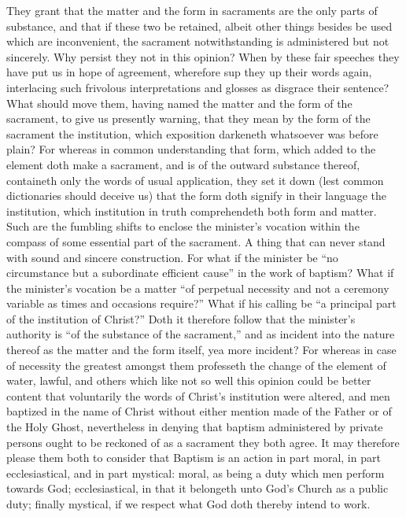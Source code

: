 They grant that the matter and the form in sacraments are the only parts of substance, and that if these two be retained, albeit other things besides be used which are inconvenient, the sacrament notwithstanding is administered but not sincerely. Why persist they not in this opinion? When by these fair speeches they have put us in hope of agreement, wherefore sup they up their words again, interlacing such frivolous interpretations and glosses as disgrace their sentence? What should move them, having named the matter and the form of the sacrament, to give us presently warning, that they mean by the form of the sacrament the institution, which exposition darkeneth whatsoever was before plain? For whereas in common understanding that form, which added to the element doth make a sacrament, and is of the outward substance thereof, containeth only the words of usual application, they set it down (lest common dictionaries should deceive us) that the form doth signify in their language the institution, which institution in truth comprehendeth both form and matter. Such are the fumbling shifts to enclose the minister’s vocation within the compass of some essential part of the sacrament.
A thing that can never stand with sound and sincere construction. For what if the minister be “no circumstance but a subordinate efficient cause” in the work of baptism? What if the minister’s vocation be a matter “of perpetual necessity and not a ceremony variable as times and occasions require?” What if his calling be “a principal part of the institution of Christ?” Doth it therefore follow that the minister’s authority is “of the substance of the sacrament,” and as incident into the nature thereof as  the matter and the form itself, yea more incident? For whereas in case of necessity the greatest amongst them professeth the change of the element of water, lawful, and others which like not so well this opinion could be better content that voluntarily the words of Christ’s institution were altered, and men baptized in the name of Christ without either mention made of the Father or of the Holy Ghost, nevertheless in denying that baptism administered by private persons ought to be reckoned of as a sacrament they both agree.
It may therefore please them both to consider that Baptism is an action in part moral, in part ecclesiastical, and in part mystical: moral, as being a duty which men perform towards God; ecclesiastical, in that it belongeth unto God’s Church as a public duty; finally mystical, if we respect what God doth thereby intend to work.

